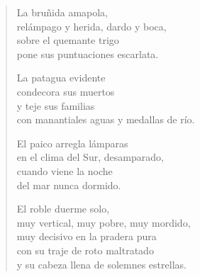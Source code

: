 \documentclass[12pt]{article}
\begin{document}
\begin{verse}
La bruñida amapola,\\
relámpago y herida, dardo y boca,\\
sobre el quemante trigo\\
pone sus puntuaciones escarlata.  

La patagua evidente\\
condecora sus muertos\\
y teje sus familias\\
con manantiales aguas y medallas de río.  

El paico arregla lámparas\\
en el clima del Sur, desamparado,\\
cuando viene la noche\\
del mar nunca dormido.  

El roble duerme solo,\\
muy vertical, muy pobre, muy mordido,\\
muy decisivo en la pradera pura\\
con su traje de roto maltratado\\
y su cabeza llena de solemnes estrellas.  

\end{verse}
\end{document}
